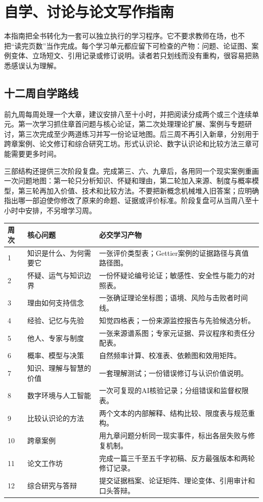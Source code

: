 \chapter{自学、讨论与论文写作指南}

本指南把全书转化为一套可以独立执行的学习程序。它不要求教师在场，也不把“读完页数”当作完成。每个学习单元都应留下可检查的产物：问题、论证图、案例变体、立场短文、引用记录或修订说明。读者若只划线而没有重构，很容易把熟悉感误认为理解。

\section{十二周自学路线}

前九周每周处理一个大章，建议安排八至十小时，并把阅读分成两个或三个连续单元。第一次学习抓住章首问题与核心论证，第二次处理理论扩展、案例与专题研讨，第三次完成至少两道练习并写一份论证地图。后三周不再引入新章，分别用于跨章案例、论文修订和综合研究工坊。形式认识论、数字认识论和比较方法三章可能需要更多时间。

三部结构还提供三次阶段复盘。完成第三、六、九章后，各用同一个现实案例重画一次问题地图：第一轮只分析知识、怀疑和理由，第二轮加入来源、制度与概率模型，第三轮再加入价值、技术和比较方法。不要把新概念机械堆入旧答案；应明确指出哪一部迫使你修改了原来的命题、证据或评价标准。阶段复盘可从当周八至十小时中安排，不另增学习周。

\begin{longtable}{p{}p{}p{}}
\toprule
周次 & 核心问题 & 必交学习产物\\\midrule\endhead
1 & 知识是什么、为何需要它 & 一张评价类型表；Gettier案例的证据路径与真值路径图。\\
2 & 怀疑、运气与知识边界 & 一份怀疑论编号论证；敏感性、安全性与能力的对照表。\\
3 & 理由如何支持信念 & 一张确证理论坐标图；语境、风险与击败者时间线。\\
4 & 经验、记忆与先验 & 知觉四格表；一份来源监控报告与先验候选分析。\\
5 & 他人、专家与制度 & 一张来源谱系图；专家元证据、异议程序和责任分配表。\\
6 & 概率、模型与决策 & 自然频率计算、校准表、依赖图和效用矩阵。\\
7 & 知识、理解与智慧的价值 & 一套理解测试；一份错误修订与认识价值说明。\\
8 & 数字环境与人工智能 & 一次可复现的AI核验记录；分组错误和监督权限表。\\
9 & 比较认识论的方法 & 两个文本的内部解释、结构比较、限度表与规范重构。\\
10 & 跨章案例 & 用九章问题分析同一现实事件，标出各层失败与修复机制。\\
11 & 论文工作坊 & 完成一篇三千至五千字初稿、反方最强版本和两轮修订记录。\\
12 & 综合研究与答辩 & 提交证据档案、论证矩阵、理论变体、引用审计和口头答辩。\\
\bottomrule
\end{longtable}

